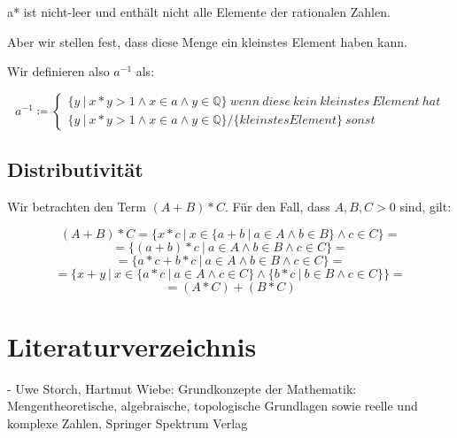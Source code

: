 \documentclass[12pt]{article}
\begin{document}
    a* ist nicht-leer und enthält nicht alle Elemente der rationalen Zahlen.

    Aber wir stellen fest, dass diese Menge ein kleinstes Element haben kann.

    Wir definieren also $a^{-1}$ als:

    \[
        a^{-1} \coloneqq
        \begin{cases}
            \{y \mspace{4mu} | \mspace{4mu} x * y > 1 \land x \in a \land y \in \mathbb{Q}\} \mspace{4mu} wenn
            \mspace{4mu} diese \mspace{4mu} kein \mspace{4mu} kleinstes \mspace{4mu} Element \mspace{4mu} hat \\
            \{y \mspace{4mu} | \mspace{4mu} x * y > 1 \land x \in a \land y \in \mathbb{Q}\} / \{kleinstes Element\} \mspace{4mu} sonst
        \end{cases}
    \]

    \subsection{Distributivität}

    Wir betrachten den Term $(A + B) * C$.
    Für den Fall, dass $A, B, C > 0$ sind, gilt:

    \[
        (A + B) * C = \{x * c \mspace{4mu} | \mspace{4mu} x \in \{a + b \mspace{4mu} | \mspace{4mu} a \in A \land b \in B\} \land c \in C\} =
    \]
    \[
        = \{(a + b) * c \mspace{4mu} | \mspace{4mu} a \in A \land b \in B \land c \in C\} =
    \]
    \[
        = \{a * c + b * c \mspace{4mu} | \mspace{4mu} a \in A \land b \in B \land c \in C\} =
    \]
    \[
        = \{x + y \mspace{4mu} | \mspace{4mu} x \in \{a * c \mspace{4mu} | \mspace{4mu} a \in A \land c \in C\} \land
        \{b * c \mspace{4mu} | \mspace{4mu} b \in B \land c \in C\}\} =
    \]
    \[
        = (A * C) + (B * C)
    \]


    \newpage

    \appendix

    \newpage

    \section{Literaturverzeichnis}

    - Uwe Storch, Hartmut Wiebe: Grundkonzepte der Mathematik: Mengentheoretische, algebraische, topologische Grundlagen
    sowie reelle und komplexe Zahlen, Springer Spektrum Verlag
\end{document}
